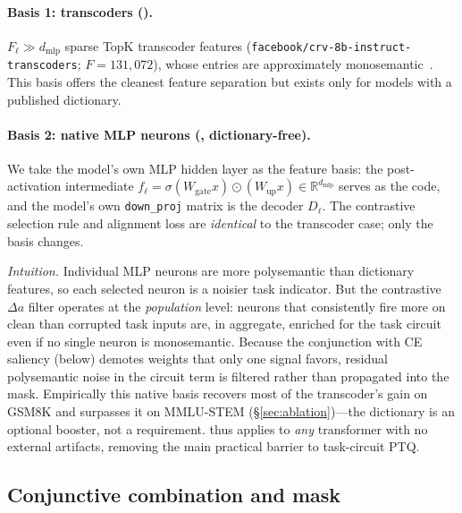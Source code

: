 \paragraph{Basis 1: transcoders (\method{}).}
$F_\ell \gg d_{\text{mlp}}$ sparse TopK transcoder features
(\texttt{facebook/crv-8b-instruct-transcoders}; $F{=}131{,}072$), whose entries
are approximately
monosemantic~\citep{bricken2023monosemanticity,dunefsky2024transcoders}. This
basis offers the cleanest feature separation but exists only for models with a
published dictionary.

\paragraph{Basis 2: native MLP neurons (\methodfree{}, dictionary-free).}
\label{sec:method-dictfree}
We take the model's own MLP hidden layer as the feature basis: the
post-activation intermediate
$f_{\ell} = \sigma(W_{\text{gate}} x) \odot (W_{\text{up}} x) \in \mathbb{R}^{d_{\text{mlp}}}$
serves as the code, and the model's own \texttt{down\_proj} matrix is the
decoder $D_\ell$. The contrastive selection rule and alignment loss are
\emph{identical} to the transcoder case; only the basis changes.

\emph{Intuition.} Individual MLP neurons are more polysemantic than dictionary
features, so each selected neuron is a noisier task indicator. But the
contrastive $\Delta a$ filter operates at the \emph{population} level: neurons
that consistently fire more on clean than corrupted task inputs are, in
aggregate, enriched for the task circuit even if no single neuron is
monosemantic. Because the conjunction with CE saliency (below) demotes weights
that only one signal favors, residual polysemantic noise in the circuit term
is filtered rather than propagated into the mask. Empirically this native
basis recovers most of the transcoder's gain on GSM8K and surpasses it on
MMLU-STEM (\S\ref{sec:ablation})---the dictionary is an optional booster, not a
requirement. \methodfree{} thus applies to \emph{any} transformer with no
external artifacts, removing the main practical barrier to task-circuit PTQ.

\subsection{Conjunctive combination and mask}
\label{sec:method-conjunction}

